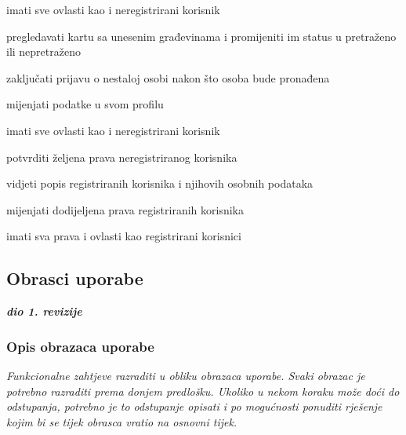 \begin{packed_enum}
\begin{packed_enum}
					
				\end{packed_enum}
				
				\item  {}
				
				\begin{packed_enum}

                        \item imati sve ovlasti kao i neregistrirani korisnik
					\item pregledavati kartu sa unesenim građevinama i promijeniti im status u pretraženo ili nepretraženo
					\item zaključati prijavu o nestaloj osobi nakon što osoba bude pronađena
					\item mijenjati podatke u svom profilu

				
				\end{packed_enum}
				
				\item  {}
				
				\begin{packed_enum}

                        \item imati sve ovlasti kao i neregistrirani korisnik
					\item potvrditi željena prava neregistriranog korisnika
					\item vidjeti popis registriranih korisnika i njihovih osobnih podataka
					\item mijenjati dodijeljena prava registriranih korisnika
					\item imati sva prava i ovlasti kao registrirani korisnici

				
				\end{packed_enum}
				
				
				
			\end{packed_enum}
			
			
			\eject 
			
			
				
			\subsection{Obrasci uporabe}
				
				\textbf{\textit{dio 1. revizije}}
				
				\subsubsection{Opis obrazaca uporabe}
					\textit{Funkcionalne zahtjeve razraditi u obliku obrazaca uporabe. Svaki obrazac je potrebno razraditi prema donjem predlošku. Ukoliko u nekom koraku može doći do odstupanja, potrebno je to odstupanje opisati i po mogućnosti ponuditi rješenje kojim bi se tijek obrasca vratio na osnovni tijek.}\\
					

